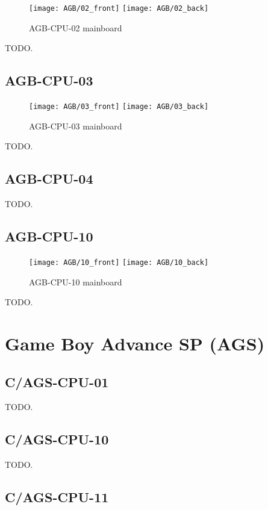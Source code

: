 \begin{figure}[H]
  \centering
  \texttt{[image: AGB/02\_front]}
  \texttt{[image: AGB/02\_back]}
  \caption{AGB-CPU-02 mainboard}
\end{figure}

TODO.

\subsection{AGB-CPU-03}

\begin{figure}[H]
  \centering
  \texttt{[image: AGB/03\_front]}
  \texttt{[image: AGB/03\_back]}
  \caption{AGB-CPU-03 mainboard}
\end{figure}

TODO.

\subsection{AGB-CPU-04}

TODO.

\subsection{AGB-CPU-10}

\begin{figure}[H]
  \centering
  \texttt{[image: AGB/10\_front]}
  \texttt{[image: AGB/10\_back]}
  \caption{AGB-CPU-10 mainboard}
\end{figure}

TODO.

\section{Game Boy Advance SP (AGS)}

\subsection{C/AGS-CPU-01}

TODO.

\subsection{C/AGS-CPU-10}

TODO.

\subsection{C/AGS-CPU-11}

